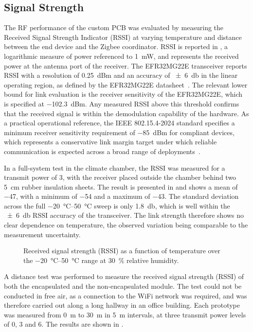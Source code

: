 \subsection{Signal Strength} \label{sec:signal_strength}
The RF performance of the custom PCB was evaluated by measuring the Received Signal Strength Indicator (RSSI) at varying temperature and distance between the end device and the Zigbee coordinator. RSSI is reported in \si{\dBm}, a logarithmic measure of power referenced to \SI{1}{\milli\watt}, and represents the received power at the antenna port of the receiver.
The EFR32MG22E transceiver reports RSSI with a resolution of \SI{0.25}{dBm} and an accuracy of \SI{\pm 6}{\decibel} in the linear operating region, as defined by the EFR32MG22E datasheet~\cite{EFR32MG22E}.
The relevant lower bound for link evaluation is the receiver sensitivity of the EFR32MG22E, which is specified at \SI{-102.3}{dBm}. Any measured RSSI above this threshold confirms that the received signal is within the demodulation capability of the hardware.
As a practical operational reference, the IEEE 802.15.4-2024 standard specifies a minimum receiver sensitivity requirement of \SI{-85}{dBm} for compliant devices, which represents a conservative link margin target under which reliable communication is expected across a broad range of deployments~\cite{IEEE8021542024}.

In a full-system test in the climate chamber, the RSSI was measured for a transmit power of \SI{3}{\dBm}, with the receiver placed outside the chamber behind two \SI{5}{\centi\meter} rubber insulation sheets. The result is presented in  and shows a mean of \SI{-47}{\dBm}, with a minimum of \SI{-54}{\dBm} and a maximum of \SI{-43}{\dBm}. The standard deviation across the full \SIrange{-20}{50}{\celsius} sweep is only \SI{1.8}{\decibel}, which is well within the \SI{\pm6}{\decibel} RSSI accuracy of the transceiver. The link strength therefore shows no clear dependence on temperature, the observed variation being comparable to the measurement uncertainty.

\begin{figure}
\centering

    \caption{Received signal strength (RSSI) as a function of temperature over the \SIrange{-20}{50}{\celsius} range at \SI{30}{\percent} relative humidity.}
    \label{fig:FS_RSSI}
\end{figure}

A distance test was performed to measure the received signal strength (RSSI) of both the encapsulated and the non-encapsulated module. The test could not be conducted in free air, as a connection to the WiFi network was required, and was therefore carried out along a long hallway in an office building. Each prototype was measured from \SI{0}{\meter} to \SI{30}{\meter} in \SI{5}{\meter} intervals, at three transmit power levels of \SI{0}{\dBm}, \SI{3}{\dBm} and \SI{6}{\dBm}. The results are shown in .

